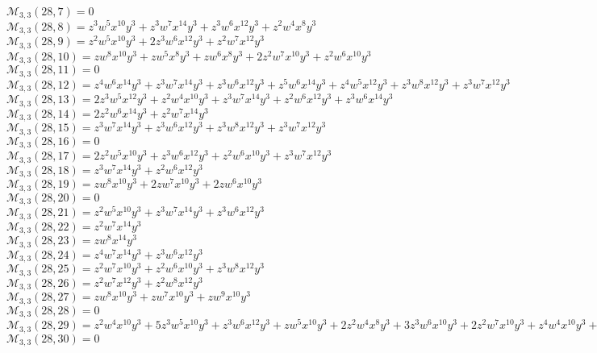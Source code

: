 \documentclass[12pt]{memoireuqam1.3}
\begin{document}
$\mathcal{M}_{3,3}(28,7)=0$\\
$\mathcal{M}_{3,3}(28,8)=z^3w^5x^{10}y^3+z^3w^7x^{14}y^3+z^3w^6x^{12}y^3+z^2w^4x^8y^3$\\
$\mathcal{M}_{3,3}(28,9)=z^2w^5x^{10}y^3+2z^3w^6x^{12}y^3+z^2w^7x^{12}y^3$\\
$\mathcal{M}_{3,3}(28,10)=zw^8x^{10}y^3+zw^5x^8y^3+zw^6x^8y^3+2z^2w^7x^{10}y^3+z^2w^6x^{10}y^3$\\
$\mathcal{M}_{3,3}(28,11)=0$\\
$\mathcal{M}_{3,3}(28,12)=z^4w^6x^{14}y^3+z^3w^7x^{14}y^3+z^3w^6x^{12}y^3+z^5w^6x^{14}y^3+z^4w^5x^{12}y^3+z^3w^8x^{12}y^3+z^3w^7x^{12}y^3$\\
$\mathcal{M}_{3,3}(28,13)=2z^3w^5x^{12}y^3+z^2w^4x^{10}y^3+z^3w^7x^{14}y^3+z^2w^6x^{12}y^3+z^3w^6x^{14}y^3$\\
$\mathcal{M}_{3,3}(28,14)=2z^2w^6x^{14}y^3+z^2w^7x^{14}y^3$\\
$\mathcal{M}_{3,3}(28,15)=z^3w^7x^{14}y^3+z^3w^6x^{12}y^3+z^3w^8x^{12}y^3+z^3w^7x^{12}y^3$\\
$\mathcal{M}_{3,3}(28,16)=0$\\
$\mathcal{M}_{3,3}(28,17)=2z^2w^5x^{10}y^3+z^3w^6x^{12}y^3+z^2w^6x^{10}y^3+z^3w^7x^{12}y^3$\\
$\mathcal{M}_{3,3}(28,18)=z^3w^7x^{14}y^3+z^2w^6x^{12}y^3$\\
$\mathcal{M}_{3,3}(28,19)=zw^8x^{10}y^3+2zw^7x^{10}y^3+2zw^6x^{10}y^3$\\
$\mathcal{M}_{3,3}(28,20)=0$\\
$\mathcal{M}_{3,3}(28,21)=z^2w^5x^{10}y^3+z^3w^7x^{14}y^3+z^3w^6x^{12}y^3$\\
$\mathcal{M}_{3,3}(28,22)=z^2w^7x^{14}y^3$\\
$\mathcal{M}_{3,3}(28,23)=zw^8x^{14}y^3$\\
$\mathcal{M}_{3,3}(28,24)=z^4w^7x^{14}y^3+z^3w^6x^{12}y^3$\\
$\mathcal{M}_{3,3}(28,25)=z^2w^7x^{10}y^3+z^2w^6x^{10}y^3+z^3w^8x^{12}y^3$\\
$\mathcal{M}_{3,3}(28,26)=z^2w^7x^{12}y^3+z^2w^8x^{12}y^3$\\
$\mathcal{M}_{3,3}(28,27)=zw^8x^{10}y^3+zw^7x^{10}y^3+zw^9x^{10}y^3$\\
$\mathcal{M}_{3,3}(28,28)=0$\\
$\mathcal{M}_{3,3}(28,29)=z^2w^4x^{10}y^3+5z^3w^5x^{10}y^3+z^3w^6x^{12}y^3+zw^5x^{10}y^3+2z^2w^4x^8y^3+3z^3w^6x^{10}y^3+2z^2w^7x^{10}y^3+z^4w^4x^{10}y^3+z^2w^5x^8y^3$\\
$\mathcal{M}_{3,3}(28,30)=0$\\
\end{document}
